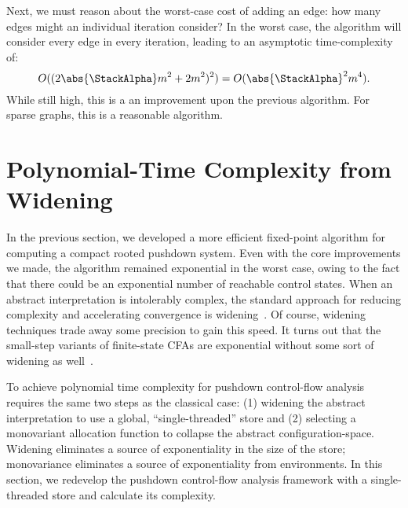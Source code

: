 Next, we must reason about the worst-case cost of adding an edge: how
many edges might an individual iteration consider?
In the worst case, the algorithm will consider every edge in every
iteration, leading to an asymptotic time-complexity of:
\begin{equation*}
  O((2\abs{\StackAlpha}m^2 + 2m^2)^2) = 
  O(\abs{\StackAlpha}^2m^4)
  \text.
\end{equation*}
While still high, this is a an improvement upon the previous
algorithm.  
For sparse graphs, this is a reasonable algorithm.




\section{Polynomial-Time Complexity from Widening}
\label{sec:widening}

In the previous section, we developed a more efficient fixed-point
algorithm for computing a compact rooted pushdown system.
Even with the core improvements we made, the algorithm remained
exponential in the worst case, owing to the fact that there could be
an exponential number of reachable control states.
When an abstract interpretation is intolerably complex, the standard
approach for reducing complexity and accelerating convergence is
widening~\cite{mattmight:Cousot:1977:AI}.
Of course, widening techniques trade away some precision to gain this
speed.
It turns out that the small-step variants of finite-state CFAs are
exponential without some sort of widening as
well~\cite{dvanhorn:VanHorn-Mairson:ICFP08}.


To achieve polynomial time complexity for pushdown control-flow
analysis requires the same two steps as the classical case: (1)
widening the abstract interpretation to use a global,
``single-threaded'' store and (2) selecting a monovariant allocation
function to collapse the abstract configuration-space.
Widening eliminates a source of exponentiality in the size of the
store; monovariance eliminates a source of exponentiality from
environments.
In this section, we redevelop the pushdown control-flow analysis
framework with a single-threaded store and calculate
its complexity.



